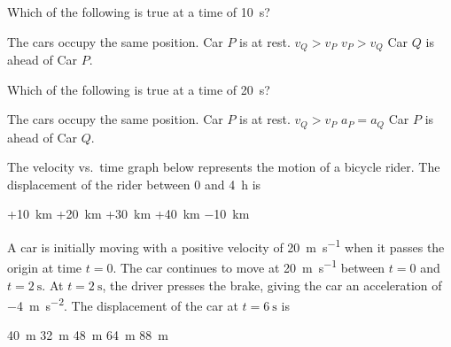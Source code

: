 \documentclass{../../../oss-ap12ibhl-print}
\begin{document}
\begin{questions}
  \question\vspace{-.15in}Which of the following is true at a time of
  \SI{10}{\second}?
  \begin{choices}
    \choice The cars occupy the same position.
    \choice Car $P$ is at rest.
    \choice $v_Q>v_P$
    \choice $v_P>v_Q$
    \choice Car $Q$ is ahead of Car $P$.
  \end{choices}
  \label{q:graph1}
    
  \question Which of the following is true at a time of \SI{20}{\second}?
  \begin{choices}
    \choice The cars occupy the same position.
    \choice Car $P$ is at rest.
    \choice $v_Q>v_P$
    \choice $a_P=a_Q$
    \choice Car $P$ is ahead of Car $Q$.
  \end{choices}
  \label{q:graph2}

  \uplevel{\rule{\linewidth}{.6pt}}
  
  \question The velocity vs.\ time graph below represents the motion of a
  bicycle rider. The displacement of the rider between $0$ and \SI{4}{\hour} is

  \begin{minipage}{.4\linewidth}
  \end{minipage}
  \begin{minipage}{.4\linewidth}
    \begin{choices}
      \choice +\SI{10}{\kilo\metre}
      \choice +\SI{20}{\kilo\metre}
      \choice +\SI{30}{\kilo\metre}
      \choice +\SI{40}{\kilo\metre}
      \choice \SI{-10}{\kilo\metre}
    \end{choices}
  \end{minipage}
  
  \uplevel{\rule{\linewidth}{.6pt}}
  
  \question A car is initially moving with a positive velocity of
  \SI{20}{\metre\per\second} when it passes the origin at time $t=0$. The car
  continues to move at \SI{20}{\metre\per\second} between $t=0$ and
  $t=\SI{2}{\second}$. At $t=\SI{2}{\second}$, the driver presses the brake,
  giving the car an acceleration of \SI{-4}{\metre\per\second\squared}. The
  displacement of the car at $t=\SI{6}{\second}$ is

  \begin{oneparchoices}
    \choice\SI{40}{\metre}\hspace{.28in}
    \choice\SI{32}{\metre}\hspace{.28in}
    \choice\SI{48}{\metre}\hspace{.28in}
    \choice\SI{64}{\metre}\hspace{.28in}
    \choice\SI{88}{\metre}
  \end{oneparchoices}


\end{questions}
\end{document}
